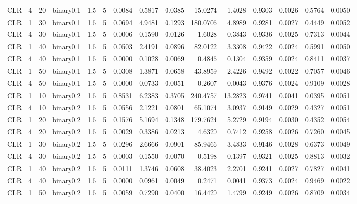 \begin{longtable}{rrrrrrrrrrrrrrr}
  CLR & 4 & 20 & binary0.1 & 1.5 & 5 & 0.0084 & 0.5817 & 0.0385 & 15.0274 & 1.4028 & 0.9303 & 0.0026 & 0.5764 & 0.0050 \\ 
  CLR & 1 & 30 & binary0.1 & 1.5 & 5 & 0.0694 & 4.9481 & 0.1293 & 180.0706 & 4.8989 & 0.9281 & 0.0027 & 0.4449 & 0.0052 \\ 
  CLR & 4 & 30 & binary0.1 & 1.5 & 5 & 0.0006 & 0.1590 & 0.0126 & 1.6028 & 0.3843 & 0.9336 & 0.0025 & 0.7313 & 0.0044 \\ 
  CLR & 1 & 40 & binary0.1 & 1.5 & 5 & 0.0503 & 2.4191 & 0.0896 & 82.0122 & 3.3308 & 0.9422 & 0.0024 & 0.5991 & 0.0050 \\ 
  CLR & 4 & 40 & binary0.1 & 1.5 & 5 & 0.0000 & 0.1028 & 0.0069 & 0.4846 & 0.1304 & 0.9359 & 0.0024 & 0.8411 & 0.0037 \\ 
  CLR & 1 & 50 & binary0.1 & 1.5 & 5 & 0.0308 & 1.3871 & 0.0658 & 43.8959 & 2.4226 & 0.9492 & 0.0022 & 0.7057 & 0.0046 \\ 
  CLR & 4 & 50 & binary0.1 & 1.5 & 5 & 0.0000 & 0.0733 & 0.0051 & 0.2607 & 0.0043 & 0.9376 & 0.0024 & 0.9109 & 0.0028 \\ 
  CLR & 1 & 10 & binary0.2 & 1.5 & 5 & 0.8531 & 6.2383 & 0.3705 & 240.4757 & 13.2823 & 0.9741 & 0.0041 & 0.0395 & 0.0051 \\ 
  CLR & 4 & 10 & binary0.2 & 1.5 & 5 & 0.0556 & 2.1221 & 0.0801 & 65.1074 & 3.0937 & 0.9149 & 0.0029 & 0.4327 & 0.0051 \\ 
  CLR & 1 & 20 & binary0.2 & 1.5 & 5 & 0.1576 & 5.1694 & 0.1348 & 179.7624 & 5.2729 & 0.9194 & 0.0030 & 0.4352 & 0.0054 \\ 
  CLR & 4 & 20 & binary0.2 & 1.5 & 5 & 0.0029 & 0.3386 & 0.0213 & 4.6320 & 0.7412 & 0.9258 & 0.0026 & 0.7260 & 0.0045 \\ 
  CLR & 1 & 30 & binary0.2 & 1.5 & 5 & 0.0296 & 2.6666 & 0.0901 & 85.9466 & 3.4833 & 0.9146 & 0.0028 & 0.6373 & 0.0049 \\ 
  CLR & 4 & 30 & binary0.2 & 1.5 & 5 & 0.0003 & 0.1550 & 0.0070 & 0.5198 & 0.1397 & 0.9321 & 0.0025 & 0.8813 & 0.0032 \\ 
  CLR & 1 & 40 & binary0.2 & 1.5 & 5 & 0.0111 & 1.3746 & 0.0608 & 38.4023 & 2.2701 & 0.9241 & 0.0027 & 0.7827 & 0.0041 \\ 
  CLR & 4 & 40 & binary0.2 & 1.5 & 5 & 0.0000 & 0.0961 & 0.0049 & 0.2471 & 0.0041 & 0.9373 & 0.0024 & 0.9469 & 0.0022 \\ 
  CLR & 1 & 50 & binary0.2 & 1.5 & 5 & 0.0059 & 0.7290 & 0.0400 & 16.4420 & 1.4799 & 0.9249 & 0.0026 & 0.8709 & 0.0034 \\ 

\end{longtable}
